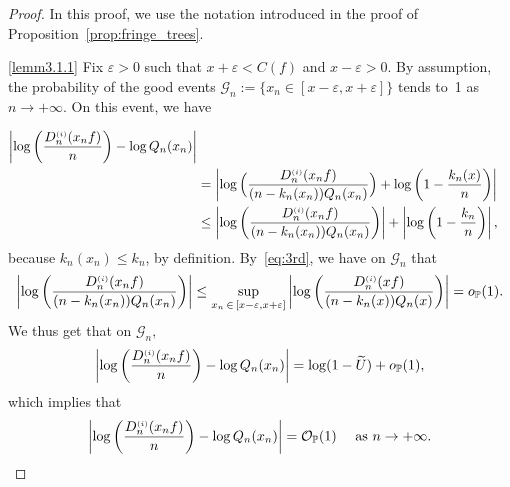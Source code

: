 \documentclass[AHL,Unicode,longabstracts,published]{cedram}
\newcommand{\sss}{\ensuremath{\scriptscriptstyle}}
\newcommand{\op}{{o_{\bbP}}}
\newcommand{\Op}{{\mathcal O_{\bbP}}}
\newcommand{\bbP}{\mathbb{P}}
\newcommand{\clG}{\mathcal{G}}
\begin{document}
\begin{proof}
In this proof, we use the notation introduced in the proof of Proposition~\ref{prop:fringe_trees}.

\noindent\eqref{lemm3.1.1} Fix $\varepsilon>0$ such that $x+\varepsilon<C(f)$ and $x-\varepsilon >0.$ By assumption, the probability of the good events $\clG_n := \{x_n\in [x-\varepsilon, x+\varepsilon]\}$ tends to~1 as $n\to+\infty$. On this event, we have

\begin{align*}
\left|\log\left(\frac{D_n^{\sss (i)}(x_n f)}n \right)-\log Q_n(x_n)\right|\\
&= \left|\log\Big(\frac{D_n^{\sss (i)}(x_n f)}{(n-k_n(x_n))Q_n(x_n)}\Big)+\log \left(1-\frac{k_n(x)}{n}\right)\right|\\
&\leq \left|\log\left(\frac{D_n^{\sss (i)}(x_n f)}{(n-k_n(x_n))Q_n(x_n)}\right)\right| + \left|\log \left(1-\frac{k_n}{n}\right)\right|,
\end{align*}
because $k_n(x_n) \leq k_n$, by definition. By~\eqref{eq:3rd}, we have on $\clG_n$ that
\[
\left|\log\left(\frac{D_n^{\sss (i)}(x_n f)}{(n-k_n(x_n))Q_n(x_n)}\right)\right|
\leq \sup_{x_n\,\in\,[x-\varepsilon, x+\varepsilon]} \left|\log\left(\frac{D_n^{\sss (i)}(x f)}{(n-k_n(x))Q_n(x)}\right)\right| = \op(1).
\]
We thus get that on $\clG_n,$
\[
\left|\log\left(\frac{D_n^{\sss (i)}(x_n f)}n\right)-\log Q_n(x_n)\right| = \log(1-\widetilde U) + \op(1),
\]
which implies that
\begin{equation}\label{eq:O1Approx}
\left|\log\left(\frac{D_n^{\sss (i)}(x_n f)}n\right)-\log Q_n(x_n)\right| =\Op(1)\quad\text{ as }n\to+\infty.
\end{equation}



\end{proof}
\end{document}
